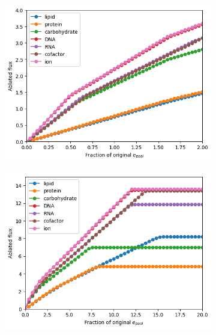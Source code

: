 \begin{figure}
  \begin{subfigure}[htpb]{0.45\textwidth}
   \centering
   \includegraphics[width=\textwidth]{epool_ec_components}
   \caption{
   }
   \label{fig:model-pool-ablated}
  \end{subfigure}%
  \begin{subfigure}[htpb]{0.45\textwidth}
   \centering
   \includegraphics[width=\textwidth]{epool_ec_components_20}
   \caption{
   }
   \label{fig:model-pool-ablated-20}
  \end{subfigure}


\end{figure}
